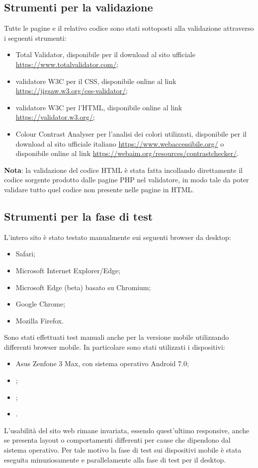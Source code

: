 	\subsection{Strumenti per la validazione}
	Tutte le pagine e il relativo codice sono stati sottoposti alla validazione attraverso i seguenti strumenti:
	\begin{itemize}
		\item Total Validator, disponibile per il download al sito ufficiale \url{https://www.totalvalidator.com/};
		\item validatore W3C per il CSS, disponibile online al link \url{https://jigsaw.w3.org/css-validator/};
		\item validatore W3C per l'HTML, disponibile online al link \url{https://validator.w3.org/};
		\item Colour Contrast Analyser per l'analisi dei colori utilizzati, disponibile per il download al sito ufficiale italiano \url{https://www.webaccessibile.org/} o disponibile online al link \url{https://webaim.org/resources/contrastchecker/}.
	\end{itemize}
	\textbf{Nota}: la validazione del codice HTML è stata fatta incollando direttamente il codice sorgente prodotto dalle pagine PHP nel validatore, in modo tale da poter validare tutto quel codice non presente nelle pagine in HTML.
	
	\subsection{Strumenti per la fase di test}
	L'intero sito è stato testato manualmente sui seguenti browser da desktop:
	\begin{itemize}
		\item Safari;
		\item Microsoft Internet Explorer/Edge;
		\item Microsoft Edge (beta) basato su Chromium;
		\item Google Chrome;
		\item Mozilla Firefox.
	\end{itemize}
	Sono stati effettuati test manuali anche per la versione mobile utilizzando differenti browser mobile. In particolare sono stati utilizzati i dispositivi:
	\begin{itemize}
		\item Asus Zenfone 3 Max, con sistema operativo Android 7.0;
		\item ;
		\item ;
		\item .
	\end{itemize}
	L’usabilità del sito web rimane invariata, essendo quest’ultimo responsive, anche se presenta layout o comportamenti differenti per cause che dipendono dal sistema operativo. Per tale motivo la fase di test sui dispositivi mobile è stata eseguita minuziosamente e parallelamente alla fase di test per il desktop.
	
